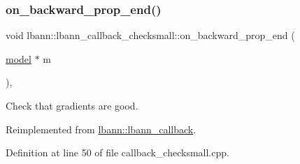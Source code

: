 \subsubsection{\texorpdfstring{on\+\_\+backward\+\_\+prop\+\_\+end()}{on\_backward\_prop\_end()}}
{\footnotesize\ttfamily void lbann\+::lbann\+\_\+callback\+\_\+checksmall\+::on\+\_\+backward\+\_\+prop\+\_\+end (\begin{DoxyParamCaption}\item[{\hyperlink{classlbann_1_1model}{model} $\ast$}]{m }\end{DoxyParamCaption})\hspace{0.3cm}{\ttfamily [override]}, {\ttfamily [virtual]}}

Check that gradients are good. 

Reimplemented from \hyperlink{classlbann_1_1lbann__callback_af183624e63ba65e0003fa988f53dee0c}{lbann\+::lbann\+\_\+callback}.



Definition at line 50 of file callback\+\_\+checksmall.\+cpp.


